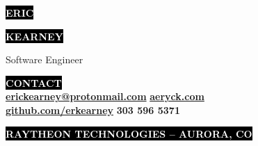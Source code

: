 \documentclass[8pt]{resumeclass}
\begin{document}

\begin{minipage}[t]{0.55\textwidth}							%
	\vspace{-\baselineskip}								%

	\colorbox{black}{\huge\textcolor{white}{\textbf{\MakeUppercase{Eric}}}}

	\colorbox{black}{\huge\textcolor{white}{\textbf{\MakeUppercase{Kearney}}}}
	
	\vspace{6pt}

	{\huge Software Engineer}
\end{minipage}
\begin{minipage}[t]{0.45\textwidth}							%
	\vspace{-\baselineskip}
	\vspace{15pt}
	\colorbox{black}{\textcolor{white}{\textbf{\MakeUppercase{Contact}}}}\\
	{{\href{mailto:erickearney@protonmail.com}{\textbf{erickearney@protonmail.com}}} \hspace*{\fill} {\href{https://aeryck.com}{\textbf{aeryck.com}}} \\
	{\href{https://github.com/erkearney}{\textbf{github.com/erkearney}}} \hspace*{\fill} \textbf{303 596 5371}}
\end{minipage}

\vspace{3pt}


\colorbox{black}{\small\textcolor{white}{\textbf{\MakeUppercase{Raytheon Technologies -- Aurora, CO}}}}
\vspace{6pt}
\end{document}
